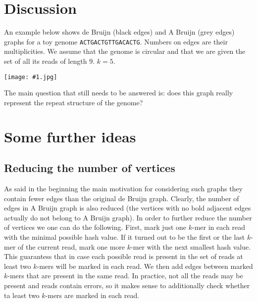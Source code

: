 \documentclass[12pt]{article}
\newcommand{\jpgpic}[1]{\begin{center}\texttt{[image: \#1.jpg]}\end{center}}
\begin{document}
\section{Discussion}
An example below shows de Bruijn (black edges) and A Bruijn (grey edges) graphs for a toy genome 
{\tt ACTGACTGTTGACACTG}. Numbers on edges are their multiplicities. We assume that the genome is circular
and that we are given the set of all its reads of length $9$. $k=5$.
\jpgpic{fig2}


The main question that still needs to be answered is:
does this graph really represent the repeat structure of the genome?

\section{Some further ideas}
\subsection{Reducing the number of vertices}
As said in the beginning the main motivation for considering such graphs
they contain fewer edges than the original de Bruijn graph. Clearly, the number of edges in
A Bruijn graph is also reduced (the vertices with no bold adjacent edges actually do not belong
to A Bruijn graph). In order to further reduce the number of vertices we one can do the following.
First, mark just one $k$-mer in each read with the minimal possible hash value. If it turned out to be
the first or the last $k$-mer of the current read, mark one more $k$-mer with the next smallest hash 
value. This guarantess that in case each possible read is present in the set of reads
at least two $k$-mers will be marked in each read. We then add edges between marked $k$-mers
that are present in the same read. In practice, not all the reads may be present and 
reads contain errors, so it makes sense to additionally check whether ta least two $k$-mers
are marked in each read.
\end{document}
